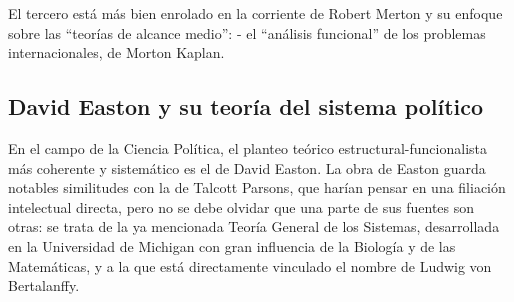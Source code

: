 \documentclass[
]{book}
\begin{document}
El tercero está más bien enrolado en la corriente de Robert Merton y su enfoque sobre las ``teorías de alcance medio'': - el ``análisis funcional'' de los problemas internacionales, de Morton Kaplan.

\hypertarget{david-easton-y-su-teoruxeda-del-sistema-poluxedtico}{%
\subsection*{David Easton y su teoría del sistema político}\label{david-easton-y-su-teoruxeda-del-sistema-poluxedtico}}

En el campo de la Ciencia Política, el planteo teórico estructural-funcionalista más coherente y sistemático es el de David Easton. La obra de Easton guarda notables similitudes con la de Talcott Parsons, que harían pensar en una filiación intelectual directa, pero no se debe olvidar que una parte de sus fuentes son otras: se trata de la ya mencionada Teoría General de los Sistemas, desarrollada en la Universidad de Michigan con gran influencia de la Biología y de las Matemáticas, y a la que está directamente vinculado el nombre de Ludwig von Bertalanffy.
\end{document}
